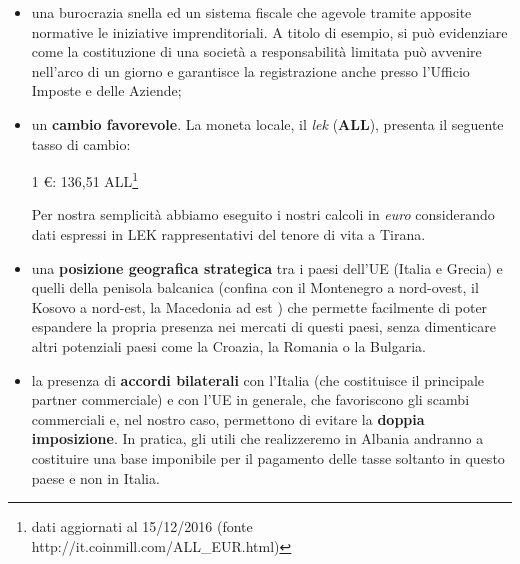 \begin{itemize}
\item una burocrazia snella ed un sistema fiscale che agevole tramite apposite normative le iniziative imprenditoriali.
		A titolo di esempio, si può evidenziare come la costituzione di una società a responsabilità limitata può avvenire nell'arco di un giorno e garantisce la registrazione anche presso l'Ufficio Imposte e delle Aziende;
\item un \textbf{cambio favorevole}. La moneta locale, il \textit{lek} (\textbf{ALL}), presenta il seguente tasso di cambio:
	\begin{center}
		1 \euro : 136,51 ALL\footnote{dati aggiornati al 15/12/2016 (fonte http://it.coinmill.com/ALL\_EUR.html)}
	\end{center}
	
	\begin{tcolorbox}[colframe=blue!75!black,adjusted title=\textbf{Osservazione!}]
		Per nostra semplicità abbiamo eseguito i nostri calcoli in \textit{euro} considerando dati espressi in LEK rappresentativi del tenore di vita a Tirana.
	\end{tcolorbox}

\item una \textbf{posizione geografica strategica} tra i paesi dell'\ac{UE} (Italia e Grecia) e quelli della penisola balcanica (confina con il Montenegro a nord-ovest, il Kosovo a nord-est, la Macedonia ad est ) che permette facilmente di poter espandere la propria presenza nei mercati di questi paesi, senza dimenticare altri potenziali paesi come la Croazia, la Romania o la Bulgaria.
\item la presenza di \textbf{accordi bilaterali} con l'Italia (che costituisce il principale partner commerciale) e con l'\ac{UE} in generale, che favoriscono gli scambi commerciali e, nel nostro caso, permettono di evitare la \textbf{doppia imposizione}\cite{accordialbaniaitalia}. In pratica, gli utili che realizzeremo in Albania andranno a costituire una base imponibile per il pagamento delle tasse soltanto in questo paese e non in Italia.  
\end{itemize}  
